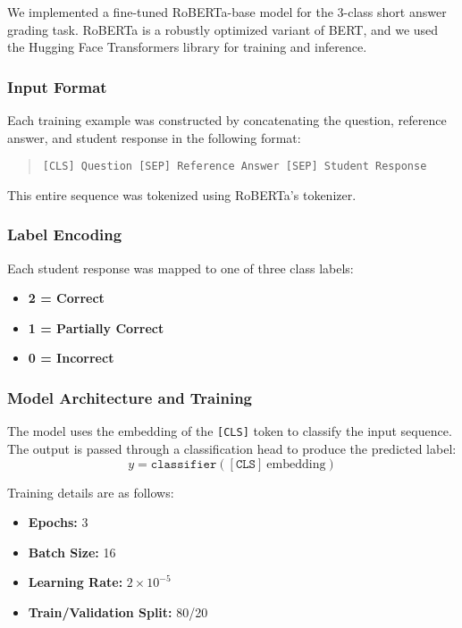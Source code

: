 \documentclass[11pt]{article}
\begin{document}
We implemented a fine-tuned RoBERTa-base model for the 3-class short answer grading task. RoBERTa is a robustly optimized variant of BERT, and we used the Hugging Face Transformers library for training and inference.

\subsubsection*{Input Format}
Each training example was constructed by concatenating the question, reference answer, and student response in the following format:

\begin{quote}
\texttt{[CLS] Question [SEP] Reference Answer [SEP] Student Response}
\end{quote}

\noindent This entire sequence was tokenized using RoBERTa's tokenizer.

\subsubsection*{Label Encoding}
Each student response was mapped to one of three class labels:

\begin{itemize}
    \item \textbf{2 = Correct}
    \item \textbf{1 = Partially Correct}
    \item \textbf{0 = Incorrect}
\end{itemize}

\subsubsection*{Model Architecture and Training}
The model uses the embedding of the \texttt{[CLS]} token to classify the input sequence. The output is passed through a classification head to produce the predicted label:
\[
y = \texttt{classifier}([\texttt{CLS}]~\text{embedding})
\]

Training details are as follows:
\begin{itemize}
    \item \textbf{Epochs:} 3
    \item \textbf{Batch Size:} 16
    \item \textbf{Learning Rate:} $2 \times 10^{-5}$
    \item \textbf{Train/Validation Split:} 80/20
\end{itemize}
\end{document}
